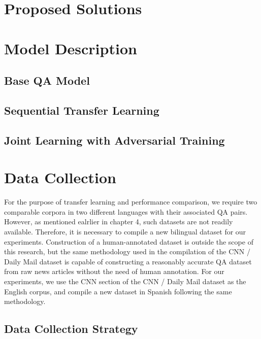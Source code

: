 \documentclass[]{article}
\begin{document}
\section{Proposed Solutions}



\section{Model Description}

\subsection{Base QA Model}

\subsection{Sequential Transfer Learning}

\subsection{Joint Learning with Adversarial Training}



\section{Data Collection}

For the purpose of transfer learning and performance comparison, we require two comparable corpora in two different languages with their associated QA pairs. However, as mentioned ealrlier in chapter 4, such datasets are not readily available. Therefore, it is necessary to compile a new bilingual dataset for our experiments. Construction of a human-annotated dataset is outside the scope of this research, but the same methodology used in the compilation of the CNN / Daily Mail dataset \cite{hermann2015teaching} is capable of constructing a reasonably accurate QA dataset from raw news articles without the need of human annotation. For our experiments, we use the CNN section of the CNN / Daily Mail dataset as the English corpus, and compile a new dataset in Spanish following the same methodology.

\subsection{Data Collection Strategy}
\end{document}
